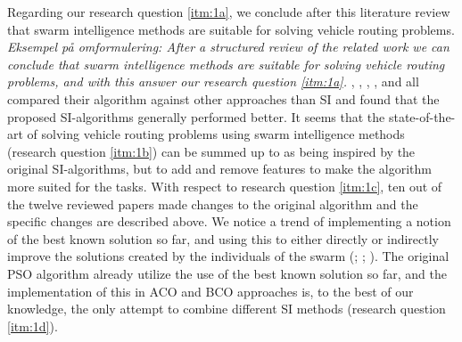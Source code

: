 Regarding our research question \ref{itm:1a}, we conclude after this literature review that swarm intelligence methods are suitable for solving vehicle routing problems.
\emph{\color{red} Eksempel på omformulering: 
After a structured review of the related work we can conclude that swarm intelligence methods are suitable for solving vehicle routing problems, and with this answer our research question \ref{itm:1a}.}
\citet{tripathi09}, \citet{dias14}, \citet{poorzahedy11}, \citet{nikolic14}, and \citet{kechagiopoulos14} all compared their algorithm against other approaches than SI and found that the proposed SI-algorithms generally performed better. It seems that the state-of-the-art of solving vehicle routing problems using swarm intelligence methods (research question \ref{itm:1b}) can be summed up to as being inspired by the original SI-algorithms, but to add and remove features to make the algorithm more suited for the tasks. With respect to research question \ref{itm:1c}, ten out of the twelve reviewed papers made changes to the original algorithm and the specific changes are described above. We notice a trend of implementing a notion of the best known solution so far, and using this to either directly or indirectly improve the solutions created by the individuals of the swarm (\citet{tripathi09}; \citet{sedighpour14}; \citet{nikolic14}). The original PSO algorithm already utilize the use of the best known solution so far, and the implementation of this in ACO and BCO approaches is, to the best of our knowledge, the only attempt to combine different SI methods (research question \ref{itm:1d}). 